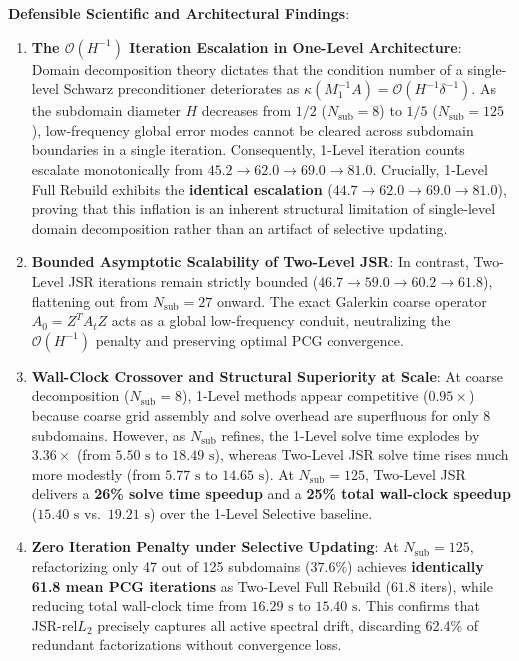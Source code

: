 \documentclass[preprint,12pt,3p]{elsarticle}
\begin{document}
\textbf{Defensible Scientific and Architectural Findings}:
\begin{enumerate}
    \item \textbf{The $\mathcal{O}(H^{-1})$ Iteration Escalation in One-Level Architecture}: Domain decomposition theory dictates that the condition number of a single-level Schwarz preconditioner deteriorates as $\kappa(M_1^{-1} A) = \mathcal{O}(H^{-1} \delta^{-1})$. As the subdomain diameter $H$ decreases from $1/2$ ($N_{\text{sub}}=8$) to $1/5$ ($N_{\text{sub}}=125$), low-frequency global error modes cannot be cleared across subdomain boundaries in a single iteration. Consequently, 1-Level iteration counts escalate monotonically from $45.2 \to 62.0 \to 69.0 \to 81.0$. Crucially, 1-Level Full Rebuild exhibits the \textbf{identical escalation} ($44.7 \to 62.0 \to 69.0 \to 81.0$), proving that this inflation is an inherent structural limitation of single-level domain decomposition rather than an artifact of selective updating.
    \item \textbf{Bounded Asymptotic Scalability of Two-Level JSR}: In contrast, Two-Level JSR iterations remain strictly bounded ($46.7 \to 59.0 \to 60.2 \to 61.8$), flattening out from $N_{\text{sub}}=27$ onward. The exact Galerkin coarse operator $A_0 = Z^T A_t Z$ acts as a global low-frequency conduit, neutralizing the $\mathcal{O}(H^{-1})$ penalty and preserving optimal PCG convergence.
    \item \textbf{Wall-Clock Crossover and Structural Superiority at Scale}: At coarse decomposition ($N_{\text{sub}}=8$), 1-Level methods appear competitive ($0.95\times$) because coarse grid assembly and solve overhead are superfluous for only 8 subdomains. However, as $N_{\text{sub}}$ refines, the 1-Level solve time explodes by $3.36\times$ (from $5.50\text{ s}$ to $18.49\text{ s}$), whereas Two-Level JSR solve time rises much more modestly (from $5.77\text{ s}$ to $14.65\text{ s}$). At $N_{\text{sub}}=125$, Two-Level JSR delivers a \textbf{26\% solve time speedup} and a \textbf{25\% total wall-clock speedup} ($15.40\text{ s}$ vs.\ $19.21\text{ s}$) over the 1-Level Selective baseline.
    \item \textbf{Zero Iteration Penalty under Selective Updating}: At $N_{\text{sub}}=125$, refactorizing only 47 out of 125 subdomains ($37.6\%$) achieves \textbf{identically 61.8 mean PCG iterations} as Two-Level Full Rebuild ($61.8$ iters), while reducing total wall-clock time from $16.29\text{ s}$ to $15.40\text{ s}$. This confirms that JSR-$\text{rel}L_2$ precisely captures all active spectral drift, discarding 62.4\% of redundant factorizations without convergence loss.
\end{enumerate}
\end{document}
